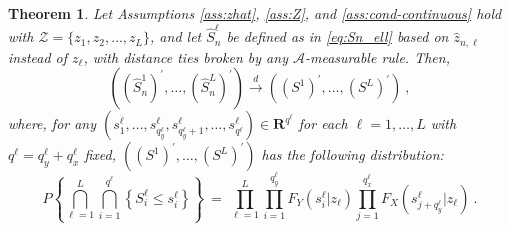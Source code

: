 \documentclass[11pt]{article}
\numberwithin{equation}{section}
\newtheorem{theorem}{Theorem}%
\begin{document}
\begin{theorem}\label{thm:limit-Sn-general}
  Let Assumptions \ref{ass:zhat}, \ref{ass:Z}, and \ref{ass:cond-continuous} hold with $\mathcal{Z}=\{z_{1},z_{2},\dots,z_{L}\}$, and let $\hat S^{\ell}_n$ be defined as in \eqref{eq:Sn_ell} based on $\hat z_{n,\ell}$ instead of $z_{\ell}$, with distance ties broken by any $\mathcal A$-measurable rule. Then,
  \begin{equation}
      (({\hat S_{n}^{1}})^{\prime},\ldots,({\hat S_{n}^{L}})^{\prime})\overset{d}{\rightarrow}
      (({S^{1}})^{\prime},\ldots,({S^{L}})^{\prime})~,
      \label{eq:limit_randomz_L0}
      \end{equation}
  where, for any $(s_{1}^{\ell},\dots,s_{q_y^\ell}^{\ell},s_{q_y^\ell+1}^{\ell},\dots,
  s_{q^\ell}^{\ell})\in\mathbf{R}^{q^\ell}$ for each $\ell=1,\dots,L$ with $q^\ell=q_y^\ell+q_x^\ell$ fixed, $(({S^{1}})^{\prime},\ldots,({S^{L}})^{\prime})$ has the following distribution:
  \begin{equation}
      P\left\{\bigcap_{\ell=1}^{L}\bigcap_{i=1}^{q^{\ell}}\left\{S_{i}^{\ell}\leq s_{i}^{\ell}
      \right\}\right\}~=~\prod_{\ell=1}^{L}\prod_{i=1}^{q_{y}^{\ell}}F_{Y}(s_{i}^{\ell}|z_{\ell})
      \prod_{j=1}^{q_{x}^{\ell}}F_{X}(s_{j+q_{y}^{\ell}}^{\ell}|z_{\ell})~.
      \label{eq:limit-Sn-general_limit_distribution}
  \end{equation}
  \end{theorem}
\end{document}
